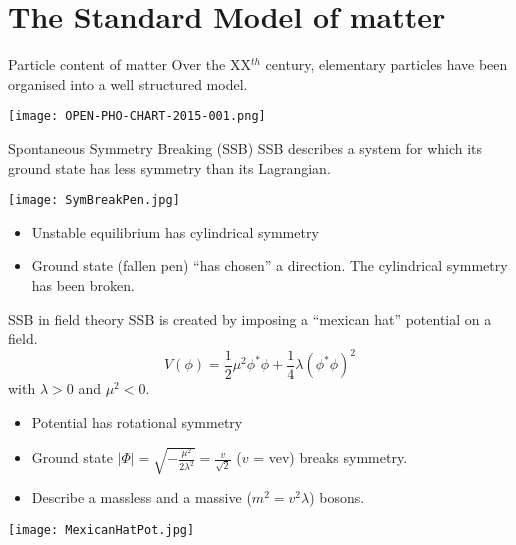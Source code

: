 \section{The Standard Model of matter}
\begin{frame}{Particle content of matter}
    Over the XX$^{th}$ century, elementary particles have been organised into a well structured model.

  \begin{center} \texttt{[image: OPEN-PHO-CHART-2015-001.png]} \end{center}
\end{frame}
\begin{frame}{Spontaneous Symmetry Breaking (SSB)}
  SSB describes a system for which its ground state has less symmetry than its Lagrangian.

  \texttt{[image: SymBreakPen.jpg]}
  \begin{itemize}
  \item Unstable equilibrium has cylindrical symmetry
  \item Ground state (fallen pen) ``has chosen'' a direction.
    The cylindrical symmetry has been broken.
  \end{itemize}
\end{frame}
\begin{frame}{SSB in field theory}
  SSB is created by imposing a ``mexican hat'' potential on a field.
  \begin{equation}
    \label{eq:orgdea495d}
    V(\phi) = \frac{1}{2}\mu^2\phi^*\phi+\frac{1}{4}\lambda(\phi^*\phi)^2
  \end{equation}
  with  $\lambda>0$ and $\mu^2 <0$.
  
  \begin{minipage}{0.49\linewidth}
  \begin{itemize}
  \item Potential has rotational symmetry
  \item Ground state $|\Phi|=\sqrt{-\frac{\mu^2}{2\lambda^2}}= \frac{v}{\sqrt{2}}$ ($v$ = vev) breaks symmetry.
  \item Describe a massless and a massive ($m^2=v^2\lambda$) bosons.
  \end{itemize}
  \end{minipage}
  \hfill
  \begin{minipage}{0.49\linewidth}
    \texttt{[image: MexicanHatPot.jpg]}
  \end{minipage}
\end{frame}
